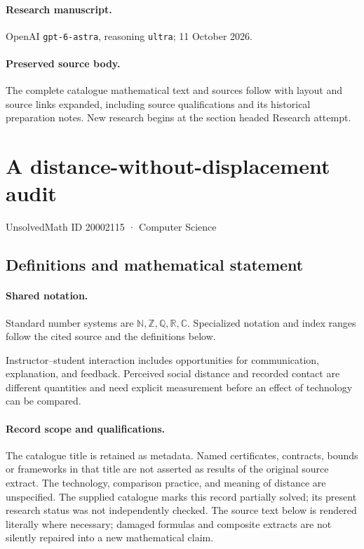 \documentclass[11pt]{article}
\begin{document}
\paragraph{Research manuscript.} OpenAI \texttt{gpt-6-astra}, reasoning \texttt{ultra}; 11 October 2026.
\paragraph{Preserved source body.} The complete catalogue mathematical text and sources follow with layout and source links expanded, including source qualifications and its historical preparation notes. New research begins at the section headed Research attempt.

\section{A distance-without-displacement audit}\label{20002115}
{\small UnsolvedMath ID 20002115 · Computer Science}
\subsection{Definitions and mathematical statement}

\paragraph{Shared notation.}Standard number systems are $\mathbb N,\mathbb Z,\mathbb Q,\mathbb R,\mathbb C$. Specialized notation and index ranges follow the cited source and the definitions below.


Instructor--student interaction includes opportunities for communication, explanation, and feedback. Perceived social distance and recorded contact are different quantities and need explicit measurement before an effect of technology can be compared.
\paragraph{Record scope and qualifications.}
The catalogue title is retained as metadata. Named certificates, contracts, bounds or frameworks in that title are not asserted as results of the original source extract.
The technology, comparison practice, and meaning of distance are unspecified. The supplied catalogue marks this record partially solved; its present research status was not independently checked.
The source text below is rendered literally where necessary; damaged formulas and composite extracts are not silently repaired into a new mathematical claim.
\end{document}
